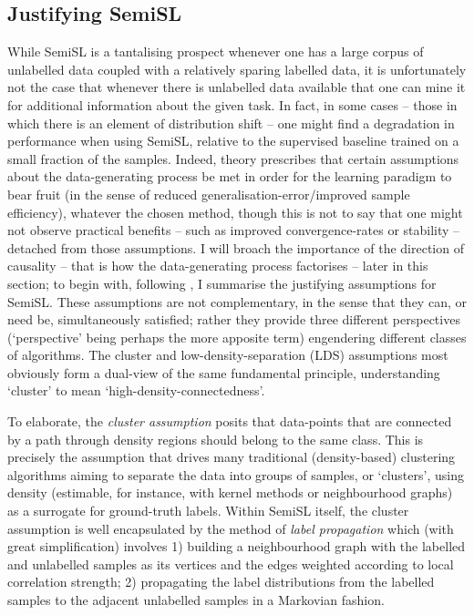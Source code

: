 \subsection{Justifying \acl{SemiSL}}\label{ssec:assumptions}
While \ac{SemiSL} is a tantalising prospect whenever one has a large corpus of unlabelled data
coupled with a relatively sparing labelled data, it is unfortunately not the case that whenever
there is unlabelled data available that one can mine it for additional information about the given
task. 
%
In fact, in some cases -- those in which there is an element of distribution shift -- one might
find a degradation in performance when using \ac{SemiSL}, relative to the supervised baseline trained on
a small fraction of the samples.
%
Indeed, theory prescribes that certain assumptions about the data-generating process be met in
order for the learning paradigm to bear fruit (in the sense of reduced
generalisation-error/improved sample efficiency), whatever the chosen method, though this is not to
say that one might not observe practical benefits -- such as improved convergence-rates or
stability -- detached from those assumptions.
%
I will broach the importance of the direction of causality -- that is how the data-generating
process factorises -- later in this section; to begin with, following \citep{chapelle2009semi}, I
summarise the justifying assumptions for \ac{SemiSL}.
%
These assumptions are not complementary, in the sense that they can, or need be, simultaneously
satisfied; rather they provide three different perspectives (`perspective' being perhaps the more
apposite term) engendering different classes of algorithms. 
%
The cluster and low-density-separation (LDS) assumptions most obviously form a dual-view of the same
fundamental principle, understanding `cluster' to mean `high-density-connectedness'.
%

%
To elaborate, the \emph{cluster assumption} posits that data-points that are connected by a path
through density regions should belong to the same class.
%
%
This is precisely the assumption that drives many traditional (density-based) clustering algorithms
aiming to separate the data into groups of samples, or `clusters', using density (estimable, for
instance, with kernel methods or neighbourhood graphs) as a surrogate for ground-truth labels.
%
Within \ac{SemiSL} itself, the cluster assumption is well encapsulated by the method of \emph{label
propagation} \citep{szummer2001partially} which (with great simplification) involves 1) building a
neighbourhood graph with the labelled and unlabelled samples as its vertices and the edges weighted
according to local correlation strength; 2) propagating the label distributions from the labelled
samples to the adjacent unlabelled samples in a Markovian fashion.
%


